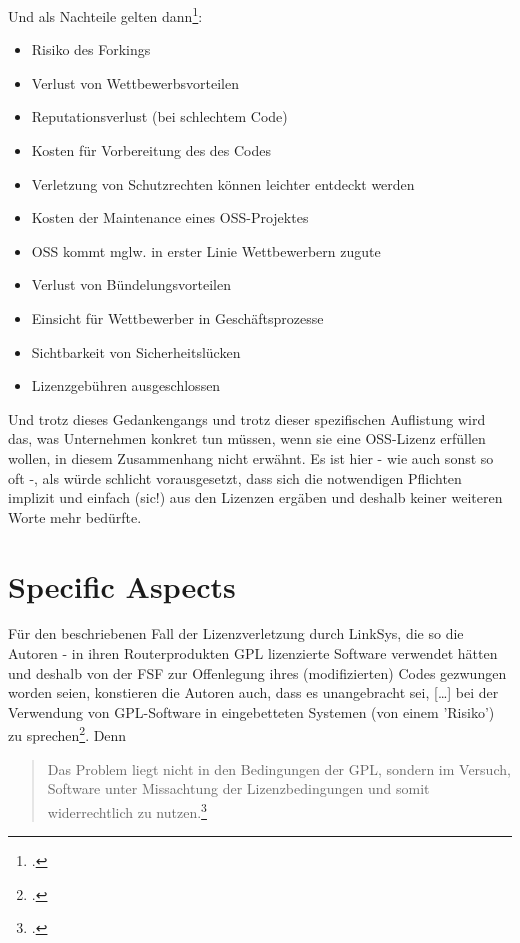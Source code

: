 \documentclass[DIV=calc,BCOR=5mm,11pt,headings=small,oneside,abstract=true, toc=bib]{scrartcl}
\begin{document}
Und als Nachteile gelten dann\footcite[vgl.][114]{BruHarPicCreFieHen2004a}:
\begin{itemize}
  \item \glqq{}Risiko des Forkings\grqq{}
  \item \glqq{}Verlust von Wettbewerbsvorteilen\grqq{}
  \item \glqq{}Reputationsverlust (bei schlechtem Code)\grqq{}
  \item \glqq{}Kosten für Vorbereitung des des Codes\grqq{}
  \item \glqq{}Verletzung von Schutzrechten können leichter entdeckt
  werden\grqq{}
  \item \glqq{}Kosten der Maintenance eines OSS-Projektes\grqq{}
  \item \glqq{}OSS kommt mglw. in erster Linie Wettbewerbern zugute\grqq{}
  \item \glqq{}Verlust von Bündelungsvorteilen\grqq{}
  \item \glqq{}Einsicht für Wettbewerber in Geschäftsprozesse\grqq{}
  \item \glqq{}Sichtbarkeit von Sicherheitslücken\grqq{}
  \item \glqq{}Lizenzgebühren ausgeschlossen\grqq{}
\end{itemize}

Und trotz dieses Gedankengangs und trotz dieser spezifischen Auflistung wird
das, was Unternehmen konkret tun müssen, wenn sie eine OSS-Lizenz erfüllen
wollen, in diesem Zusammenhang nicht erwähnt. Es ist hier - wie auch sonst so
oft -, als würde schlicht vorausgesetzt, dass sich die notwendigen Pflichten
implizit und einfach (sic!) aus den Lizenzen ergäben und deshalb keiner weiteren
Worte mehr bedürfte.

\section{Specific Aspects}

Für den beschriebenen Fall der Lizenzverletzung durch LinkSys, die so die
Autoren - in ihren Routerprodukten GPL lizenzierte Software verwendet hätten und
deshalb von der FSF zur Offenlegung ihres (modifizierten) Codes gezwungen worden
seien, konstieren die Autoren auch, dass es \glqq{}unangebracht\grqq{} sei,
\glqq{}[\ldots] bei der Verwendung von GPL-Software in eingebetteten Systemen
(von einem 'Risiko') zu
sprechen\grqq{}\footcite[vgl.][111]{BruHarPicCreFieHen2004a}. Denn \begin{quote}
\glqq{}Das Problem liegt nicht in den Bedingungen der GPL, sondern im Versuch,
Software unter Missachtung der Lizenzbedingungen und somit widerrechtlich zu
nutzen.\grqq{}\footcite[][111]{BruHarPicCreFieHen2004a}
\end{quote}
\small

\end{document}
